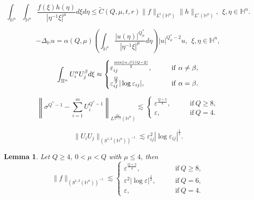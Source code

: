 \documentclass[10pt,a4paper]{amsart}
\newtheorem{lemma}{Lemma}
\begin{document}
	\begin{equation}\label{eq:HLSH} \int_{\mathbb{H}^{n}}\int_{\mathbb{H}^{n}}\frac{f(\xi)h(\eta)}{|\eta^{-1}\xi|^{\mu}}
d\xi{d}\eta\leq \widetilde{C}(Q,\mu,t,r)\|f\|_{L^t(\mathbb{H}^{n})}\|h\|_{L^r(\mathbb{H}^{n})}, ~~\xi,\eta\in\mathbb{H}^{n}.
	\end{equation}	

\begin{equation}\label{limit3}
  -\Delta_{\mathbb{H}} u=\alpha(Q,\mu)\left(\int_{\mathbb{H}^{n}}\frac{|u(\eta)|
^{Q^{\ast}_{\mu}}}{|\eta^{-1}\xi|^{\mu}}{d}\eta\right)|u|^{Q_\mu^*-2}u,~~\xi,\eta\in\mathbb{H}^{n},
\end{equation}

\begin{equation}\label{main00}
  \int_{\mathbb{H}^{n}}U_i^\alpha U_j^\beta d\xi\approx
  \begin{cases}
  \varepsilon_{ij}^{\frac{\min\{\alpha,\beta\}(Q-2)}{2}}, \qquad & \mathrm{if} ~ \alpha\neq\beta, \vspace{.2cm}  \\
  \varepsilon_{ij}^{\frac{Q}{2}}|\log \varepsilon_{ij}|, \qquad & \mathrm{if} ~ \alpha=\beta.
  \end{cases}
\end{equation}

\begin{equation}\label{main02}
 \left\| \sigma^{Q^{*}-1}-\sum\limits_{i=1}^m U_i^{Q^*-1}\right\|_{L^{\frac{2Q}{Q+2}}(\mathbb{H}^{n})} \lesssim
 \begin{cases}
 \varepsilon^{\frac{Q+2}{4}}, \qquad & \mathrm{if} ~ Q\geq8, \\
 \varepsilon, \qquad & \mathrm{if} ~ Q=4.
 \end{cases}
\end{equation}

\begin{equation}\label{main03}
 \|U_i U_j\|_{(S^{1,2}(\mathbb{H}^{n}))^{-1}} \lesssim \varepsilon_{ij}^2 |\log \varepsilon_{ij}|^{\frac{1}{2}}.
\end{equation}

  \begin{lemma}\label{main2}
 Let $Q\geq 4$, $0<\mu< Q$ with $\mu\leq 4$, then
  \begin{equation*}
  \|f\|_{(S^{1,2}(\mathbb{H}^{n}))^{-1}}\lesssim
  \begin{cases}
             \varepsilon^{\frac{Q+2}{4}}, \qquad & \mathrm{if} ~ Q\geq8, \\
             \varepsilon^2|\log \varepsilon|^{\frac{1}{2}},\qquad & \mathrm{if} ~ Q=6,\\
              \varepsilon, \qquad& \mathrm{if} ~ Q=4.
           \end{cases}
  \end{equation*}
\end{lemma}
\end{document}
